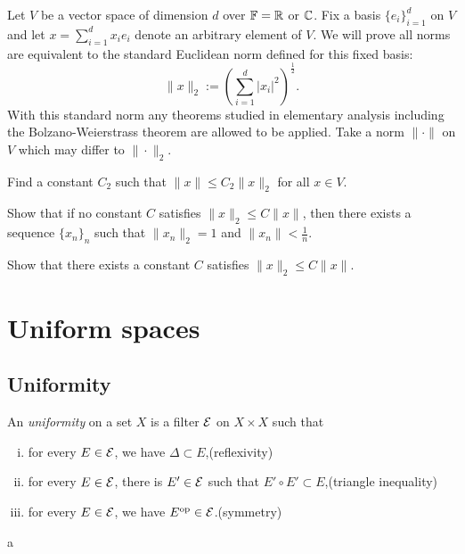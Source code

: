 \documentclass{../../large}
\begin{document}
\begin{prb}
Let $V$ be a vector space of dimension $d$ over $\mathbb{F}=\mathbb{R}$ or $\mathbb{C}$.
Fix a basis $\{e_i\}_{i=1}^d$ on $V$ and let $x=\sum_{i=1}^dx_ie_i$ denote an arbitrary element of $V$.
We will prove all norms are equivalent to the standard Euclidean norm defined for this fixed basis:
\[\|x\|_2:=(\sum_{i=1}^d|x_i|^2)^{\frac12}.\]
With this standard norm any theorems studied in elementary analysis including the Bolzano-Weierstrass theorem are allowed to be applied.
Take a norm $\|\cdot\|$ on $V$ which may differ to $\|\cdot\|_2$.
\begin{parts}
\item Find a constant $C_2$ such that $\|x\|\le C_2\|x\|_2$ for all $x\in V$.
\item Show that if no constant $C$ satisfies $\|x\|_2\le C\|x\|$, then there exists a sequence $\{x_n\}_n$ such that $\|x_n\|_2=1$ and $\|x_n\|<\tfrac1n$.
\item Show that there exists a constant $C$ satisfies $\|x\|_2\le C\|x\|$.
\end{parts}
\end{prb}


\chapter{Uniform spaces}

\section{Uniformity}

\begin{prb}
An \emph{uniformity} on a set $X$ is a filter $\mathcal{E}$ on $X\times X$ such that
\begin{enumerate}[(i)]
\item for every $E\in\mathcal{E}$, we have $\Delta\subset E$,\hfill(reflexivity)
\item for every $E\in\mathcal{E}$, there is $E'\in\mathcal{E}$ such that $E'\circ E'\subset E$,\hfill(triangle inequality)
\item for every $E\in\mathcal{E}$, we have $E^{\mathrm{op}}\in\mathcal{E}$.\hfill(symmetry)
\end{enumerate}
\begin{parts}
\item a
\end{parts}
\end{prb}
\end{document}
